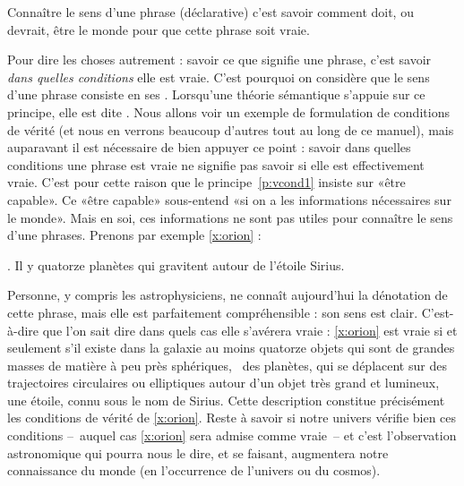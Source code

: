\begin{princ}\label{p:vcond2}
Connaître  le sens d'une
phrase (déclarative) c'est savoir comment doit, ou devrait, être le monde pour
que cette phrase soit vraie. 
\end{princ}


Pour dire les choses  autrement : savoir ce que signifie une phrase,
c'est savoir \emph{dans quelles conditions} elle est vraie.  C'est pourquoi
on considère que le sens d'une phrase consiste en ses . 
Lorsqu'une théorie sémantique s'appuie sur ce principe,
elle est dite .
Nous allons voir un exemple de formulation de conditions de vérité (et
nous en verrons beaucoup d'autres tout au long de ce manuel), mais
auparavant il est nécessaire de bien appuyer ce point :
savoir dans quelles conditions une phrase est vraie ne signifie pas
savoir si elle est effectivement vraie.  C'est pour cette raison que
le principe~\ref{p:vcond1} insiste sur «être capable».  Ce «être
capable» sous-entend «si on a les informations nécessaires sur le
monde».  Mais en soi, ces informations ne sont pas utiles pour
connaître le sens d'une phrases. Prenons par exemple \ref{x:orion} :

\ex. \label{x:orion}
Il y quatorze planètes qui gravitent autour de l'étoile Sirius.


Personne, y compris les astrophysiciens, ne connaît aujourd'hui la
dénotation de cette phrase, mais elle est parfaitement compréhensible :
son sens est clair.  C'est-à-dire que l'on sait dire dans quels cas
elle s'avérera vraie : \ref{x:orion} est vraie si et seulement s'il
existe dans la galaxie au moins quatorze objets qui sont de grandes
masses de matière à peu près sphériques, \ie\ des planètes, qui se
déplacent sur des trajectoires circulaires ou elliptiques autour d'un
objet très grand et lumineux, une étoile, connu sous le nom de
Sirius.  Cette description constitue précisément les conditions de
vérité de \ref{x:orion}.  Reste à savoir si notre univers vérifie
bien ces conditions --~auquel cas \ref{x:orion} sera admise comme
vraie~-- et c'est l'observation astronomique qui pourra nous le dire,
et se faisant, augmentera notre connaissance du monde (en l'occurrence
de l'univers ou du cosmos).

